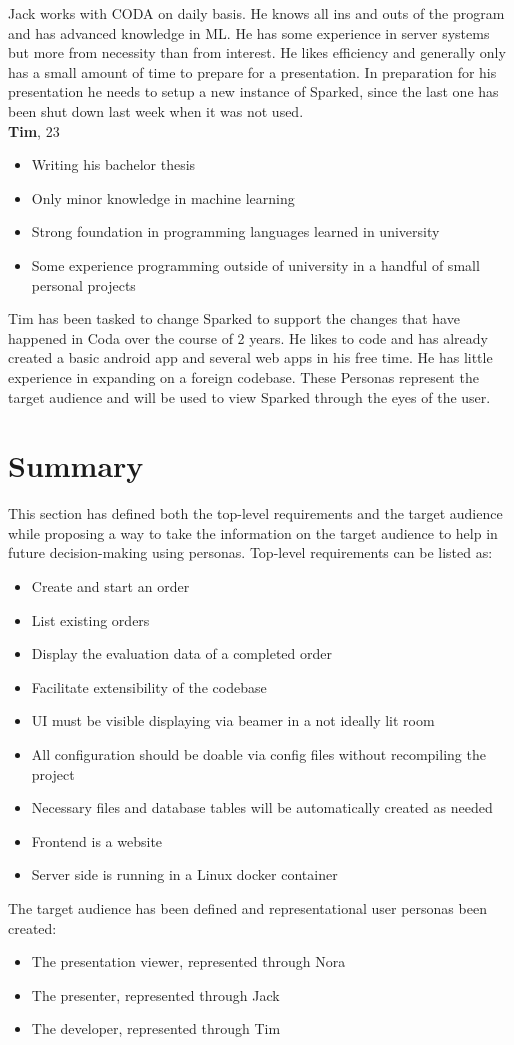 Jack works with CODA on daily basis. He knows all ins and outs of the program and has advanced knowledge in ML. He has some experience in server systems but more from necessity than from interest. He likes efficiency and generally only has a small amount of time to prepare for a presentation. In preparation for his presentation he needs to setup a new instance of Sparked, since the last one has been shut down last week when it was not used. \\

\noindent
\textbf{Tim}, 23
\begin{itemize}
\item	Writing his bachelor thesis
\item	Only minor knowledge in machine learning
\item	Strong foundation in programming languages learned in university
\item	Some experience programming outside of university in a handful of small personal projects
\end{itemize}

Tim has been tasked to change Sparked to support the changes that have happened in Coda over the course of 2 years. He likes to code and has already created a basic android app and several web apps in his free time. He has little experience in expanding on a foreign codebase.
These Personas represent the target audience and will be used to view Sparked through the eyes of the user.

\section{Summary}
This section has defined both the top-level requirements and the target audience while proposing a way to take the information on the target audience to help in future decision-making using personas.
Top-level requirements can be listed as:
\begin{itemize}
\item	Create and start an order
\item	List existing orders
\item	Display the evaluation data of a completed order
\item	Facilitate extensibility of the codebase
\item	UI must be visible displaying via beamer in a not ideally lit room
\item	All configuration should be doable via config files without recompiling the project
\item	Necessary files and database tables will be automatically created as needed
\item	Frontend is a website 
\item	Server side is running in a Linux docker container
\end{itemize}

The target audience has been defined and representational user personas been created:
\begin{itemize}
\item	The presentation viewer, represented through Nora
\item	The presenter, represented through Jack
\item	The developer, represented through Tim
\end{itemize}


